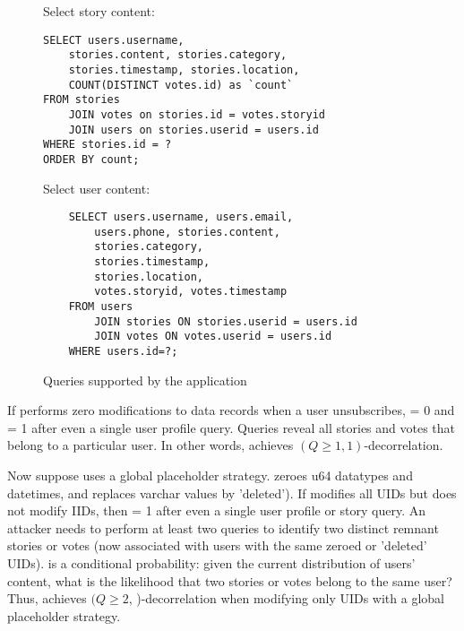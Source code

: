 \begin{figure*}
    \centering
\begin{minipage}[t]{0.45\textwidth}
    \centering
    Select story content:
\begin{verbatim}
SELECT users.username, 
    stories.content, stories.category, 
    stories.timestamp, stories.location, 
    COUNT(DISTINCT votes.id) as `count`
FROM stories 
    JOIN votes on stories.id = votes.storyid
    JOIN users on stories.userid = users.id
WHERE stories.id = ?
ORDER BY count;
\end{verbatim}
\end{minipage}
\begin{minipage}[t]{0.45\textwidth}
    \centering
    Select user content:
\begin{verbatim}
    SELECT users.username, users.email, 
        users.phone, stories.content, 
        stories.category, 
        stories.timestamp, 
        stories.location, 
        votes.storyid, votes.timestamp 
    FROM users 
        JOIN stories ON stories.userid = users.id 
        JOIN votes ON votes.userid = users.id
    WHERE users.id=?;
\end{verbatim}
\end{minipage}
    \caption{Queries supported by the application}
\label{fig:appqs}
\end{figure*}
If \sys{} performs zero modifications to data records when a user unsubscribes, \premnant{} = 0 and
\plinked{} = 1 after even a single user profile query. Queries reveal all stories and votes that belong to a particular user. In other
words, \sys{} achieves $(Q \geq 1, 1)$-decorrelation.

Now suppose \sys{} uses a global placeholder strategy.  \sys{} zeroes u64 datatypes and datetimes,
and replaces varchar values by 'deleted').  If \sys{} modifies all UIDs but does not modify IIDs,
then \premnant{} = 1 after even a single user profile or story query.  An attacker needs to perform
at least two queries to identify two distinct remnant stories or votes (now associated with users with
the same zeroed or 'deleted' UIDs). 
\plinked{} is a conditional probability: given the current distribution of users' content, what is
the likelihood that two stories or votes belong to the same user?
Thus, \sys{} achieves $(Q \geq 2$, \plinked{})-decorrelation when modifying only UIDs with a global
placeholder strategy.
